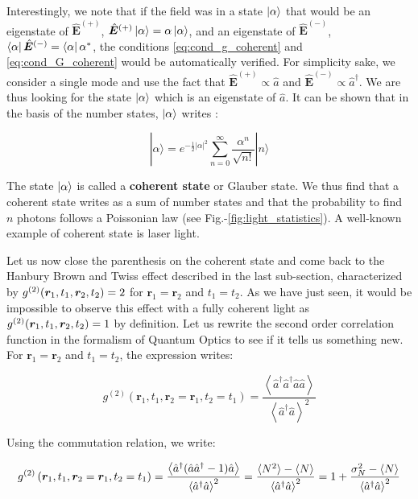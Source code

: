 Interestingly, we note that if the field was in a state $\ket{\alpha}$ that would be an eigenstate of $\hat{\bm{E}}^{(+)}$, $\hat{\bm{E}}^{(+)} \ket{\alpha} = \alpha \ket{\alpha}$, and an eigenstate of $\hat{\bm{E}}^{(-)}$, $\bra{\alpha} \hat{\bm{E}}^{(-)} = \bra{\alpha} \alpha^*$, the conditions \ref{eq:cond_g_coherent} and \ref{eq:cond_G_coherent} would be automatically verified. For simplicity sake, we consider a single mode and use the fact that $\hat{\bm{E}}^{(+)} \propto \hat{a}$ and $\hat{\bm{E}}^{(-)} \propto \hat{a}^{\dagger}$. We are thus looking for the state $\ket{\alpha}$ which is an eigenstate of $\hat{a}$. It can be shown that in the basis of the number states, $\ket{\alpha}$ writes \cite{glauber1963coherent}:

\begin{equation}
    |\alpha\rangle=e^{-\frac{1}{2}|\alpha|^{2}} \sum_{n=0}^{\infty} \frac{\alpha^{n}}{\sqrt{n !}}|n\rangle
    \label{eq:coherent_state}
\end{equation}

\noindent The state $\ket{\alpha}$ is called a \textbf{coherent state} or Glauber state. We thus find that a coherent state writes as a sum of number states and that the probability to find $n$ photons follows a Poissonian law (see Fig.-\ref{fig:light_statistics}). A well-known example of coherent state is laser light.

Let us now close the parenthesis on the coherent state and come back to the Hanbury Brown and Twiss effect described in the last sub-section, characterized by $g^{(2)} (\bm{r}_1, t_1, \bm{r}_2, t_2) = 2$ for $\bm{r}_1 = \bm{r}_2$ and $t_1=t_2$. As we have just seen, it would be impossible to observe this effect with a fully coherent light as $g^{(2)} (\bm{r}_1, t_1, \bm{r}_2, t_2) = 1$ by definition. Let us rewrite the second order correlation function in the formalism of Quantum Optics to see if it tells us something new. For $\bm{r}_1 = \bm{r}_2$ and $t_1=t_2$, the expression writes: 

\begin{equation}
     g^{(2)}\left(\bm{r}_{1}, t_{1}, \bm{r}_{2}=\bm{r}_1, t_{2}=t_1\right) = \frac{\left\langle\hat{a}^{\dagger} \hat{a}^{\dagger} \hat{a} \hat{a}\right\rangle} {\left\langle\hat{a}^{\dagger} \hat{a}\right\rangle^{2}}
\end{equation}

\noindent Using the commutation relation, we write:

\begin{equation}
    g^{(2)}\left(\bm{r}_{1}, t_{1}, \bm{r}_{2}=\bm{r}_1, t_{2}=t_1\right) = \frac{\left\langle\hat{a}^{\dagger} ( \hat{a} \hat{a}^{\dagger}-1) \hat{a} \right\rangle} {\left\langle\hat{a}^{\dagger} \hat{a}\right\rangle^{2}} = \frac{\langle N^2\rangle-\langle N\rangle}{\left\langle\hat{a}^{\dagger} \hat{a}\right\rangle^{2}}  = 1 +  \frac{\sigma^2_N-\langle N\rangle}{\left\langle\hat{a}^{\dagger} \hat{a}\right\rangle^{2}}
    \label{eq:g2_variance}
\end{equation}

